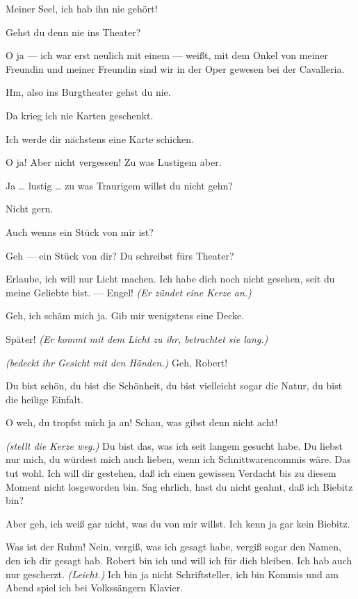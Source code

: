 \documentclass[
	final,
	a4paper,
	ngerman,
	mpinclude = true, %
	twoside = true,
	open = right,
	cleardoublepage = plain,
	DIV = 13,
	BCOR = 1cm,
	titlepage = firstiscover,
	]{scrbook}
\newcommand{\direction}[1]{\textit{(#1)}}
\newcommand{\thecharacter}[1]{\textup{\textsc{#1}}\xspace}
\newcommand{\thesuesse}{\thecharacter{Süßes Mädel}}
\newcommand{\thedichter}{\thecharacter{Dichter}}
\newcommand{\character}[1]{\item[#1:]}
\newcommand{\suesse}{\character{\thesuesse}}
\newcommand{\dichter}{\character{\thedichter}}
\begin{document}
\begin{play}
	\suesse
	Meiner Seel, ich hab ihn nie gehört!

	\dichter
	Gehst du denn nie ins Theater?

	\suesse
	O ja --- ich war erst neulich mit einem --- weißt, mit dem Onkel von meiner Freundin und meiner Freundin sind wir in der Oper gewesen bei der Cavalleria.

	\dichter
	Hm, also ins Burgtheater gehst du nie.

	\suesse
	Da krieg ich nie Karten geschenkt.

	\dichter
	Ich werde dir nächstens eine Karte schicken.

	\suesse
	O ja! Aber nicht vergessen! Zu was Lustigem aber.

	\dichter
	Ja \ldots{} lustig \ldots{} zu was Traurigem willst du nicht gehn?

	\suesse
	Nicht gern.

	\dichter
	Auch wenns ein Stück von mir ist?

	\suesse
	Geh --- ein Stück von dir? Du schreibst fürs Theater?

	\dichter
	Erlaube, ich will nur Licht machen. Ich habe dich noch nicht gesehen, seit du meine Geliebte bist. --- Engel! \direction{Er zündet eine Kerze an.}

	\suesse
	Geh, ich schäm mich ja. Gib mir wenigstens eine Decke.

	\dichter
	Später! \direction{Er kommt mit dem Licht zu ihr, betrachtet sie lang.}

	\suesse
	\direction{bedeckt ihr Gesicht mit den Händen.} Geh, Robert!

	\dichter
	Du bist schön, du bist die Schönheit, du bist vielleicht sogar die Natur, du bist die heilige Einfalt.

	\suesse
	O weh, du tropfst mich ja an! Schau, was gibst denn nicht acht!

	\dichter
	\direction{stellt die Kerze weg.} Du bist das, was ich seit langem gesucht habe. Du liebst nur mich, du würdest mich auch lieben, wenn ich Schnittwarencommis wäre. Das tut wohl. Ich will dir gestehen, daß ich einen gewissen Verdacht bis zu diesem Moment nicht losgeworden bin. Sag ehrlich, hast du nicht geahnt, daß ich Biebitz bin?

	\suesse
	Aber geh, ich weiß gar nicht, was du von mir willst. Ich kenn ja gar kein Biebitz.

	\dichter
	Was ist der Ruhm! Nein, vergiß, was ich gesagt habe, vergiß sogar den Namen, den ich dir gesagt hab. Robert bin ich und will ich für dich bleiben. Ich hab auch nur gescherzt. \direction{Leicht.} Ich bin ja nicht Schriftsteller, ich bin Kommis und am Abend spiel ich bei Volkssängern Klavier.


\end{play}
\end{document}
